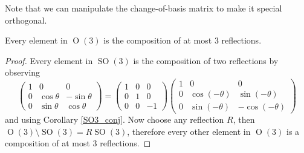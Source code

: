 Note that we can manipulate the change-of-basis matrix to make it special orthogonal.
\begin{corollary}
    Every element in $\operatorname{O}(3)$ is the composition of at most $3$ reflections.
\end{corollary}
\begin{proof}
    Every element in $\operatorname{SO}(3)$ is the composition of two reflections by observing
    $$\begin{pmatrix}
        1&0&0\\
        0&\cos\theta&-\sin\theta\\
        0&\sin\theta&\cos\theta
    \end{pmatrix}=\begin{pmatrix}
        1&0&0\\
        0&1&0\\
        0&0&-1
    \end{pmatrix}\begin{pmatrix}
        1&0&0\\
        0&\cos(-\theta)&\sin(-\theta)\\
        0&\sin(-\theta)&-\cos(-\theta)
    \end{pmatrix}$$
    and using Corollary \ref{SO3_conj}.
    Now choose any reflection $R$, then $\operatorname{O}(3)\setminus\operatorname{SO}(3)=R\operatorname{SO}(3)$, therefore every other element in $\operatorname{O}(3)$ is a composition of at most $3$ reflections.
\end{proof}
